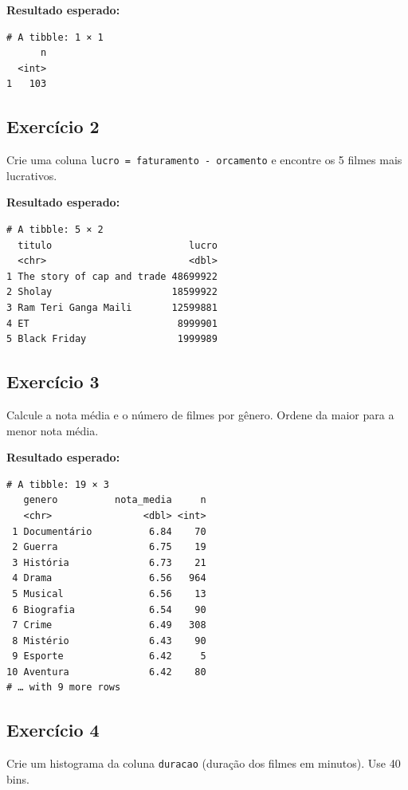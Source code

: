 \documentclass[
  letterpaper,
]{scrbook}
\begin{document}
\textbf{Resultado esperado:}

\begin{verbatim}
# A tibble: 1 × 1
      n
  <int>
1   103
\end{verbatim}

\subsection{Exercício 2}\label{exercuxedcio-2-8}

Crie uma coluna \texttt{lucro\ =\ faturamento\ -\ orcamento} e encontre
os 5 filmes mais lucrativos.

\textbf{Resultado esperado:}

\begin{verbatim}
# A tibble: 5 × 2
  titulo                        lucro
  <chr>                         <dbl>
1 The story of cap and trade 48699922
2 Sholay                     18599922
3 Ram Teri Ganga Maili       12599881
4 ET                          8999901
5 Black Friday                1999989
\end{verbatim}

\subsection{Exercício 3}\label{exercuxedcio-3-7}

Calcule a nota média e o número de filmes por gênero. Ordene da maior
para a menor nota média.

\textbf{Resultado esperado:}

\begin{verbatim}
# A tibble: 19 × 3
   genero          nota_media     n
   <chr>                <dbl> <int>
 1 Documentário          6.84    70
 2 Guerra                6.75    19
 3 História              6.73    21
 4 Drama                 6.56   964
 5 Musical               6.56    13
 6 Biografia             6.54    90
 7 Crime                 6.49   308
 8 Mistério              6.43    90
 9 Esporte               6.42     5
10 Aventura              6.42    80
# … with 9 more rows
\end{verbatim}

\subsection{Exercício 4}\label{exercuxedcio-4-4}

Crie um histograma da coluna \texttt{duracao} (duração dos filmes em
minutos). Use 40 bins.
\end{document}
